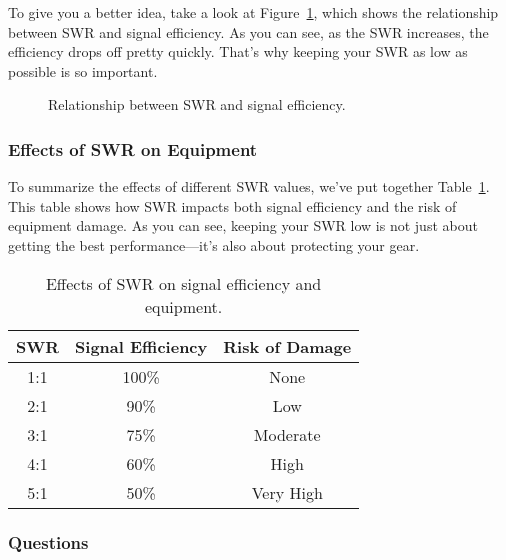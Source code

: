 To give you a better idea, take a look at Figure~\ref{fig:swr-efficiency}, which shows the relationship between SWR and signal efficiency. As you can see, as the SWR increases, the efficiency drops off pretty quickly. That’s why keeping your SWR as low as possible is so important.

\begin{figure}[h!]
    \centering
    \caption{Relationship between SWR and signal efficiency.}
    \label{fig:swr-efficiency}
\end{figure}

\subsubsection*{Effects of SWR on Equipment}
To summarize the effects of different SWR values, we’ve put together Table~\ref{tab:swr-effects}. This table shows how SWR impacts both signal efficiency and the risk of equipment damage. As you can see, keeping your SWR low is not just about getting the best performance—it’s also about protecting your gear.

\begin{table}[h!]
    \centering
    \begin{tabular}{|c|c|c|}
        \hline
        \textbf{SWR} & \textbf{Signal Efficiency} & \textbf{Risk of Damage} \\
        \hline
        1:1 & 100\% & None \\
        2:1 & 90\% & Low \\
        3:1 & 75\% & Moderate \\
        4:1 & 60\% & High \\
        5:1 & 50\% & Very High \\
        \hline
    \end{tabular}
    \caption{Effects of SWR on signal efficiency and equipment.}
    \label{tab:swr-effects}
\end{table}

\subsubsection*{Questions}


